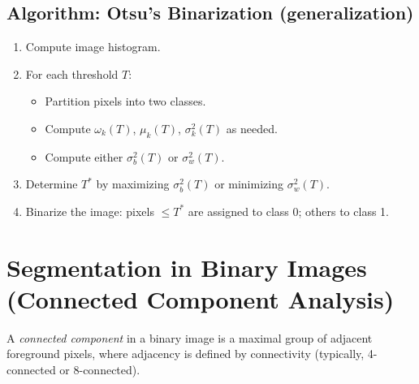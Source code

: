 \subsection{Algorithm: Otsu’s Binarization (generalization)}

\begin{enumerate}
    \item Compute image histogram.
    \item For each threshold $T$:
    \begin{itemize}
        \item Partition pixels into two classes.
        \item Compute $\omega_k(T)$, $\mu_k(T)$, $\sigma_k^2(T)$ as needed.
        \item Compute either $\sigma_b^2(T)$ or $\sigma_w^2(T)$.
    \end{itemize}
    \item Determine $T^*$ by maximizing $\sigma_b^2(T)$ or minimizing $\sigma_w^2(T)$.
    \item Binarize the image: pixels $\leq T^*$ are assigned to class 0; others to class 1.
\end{enumerate}



\section{Segmentation in Binary Images (Connected Component Analysis)}

A \emph{connected component} in a binary image is a maximal group of adjacent foreground pixels, where adjacency is defined by connectivity (typically, 4-connected or 8-connected).

